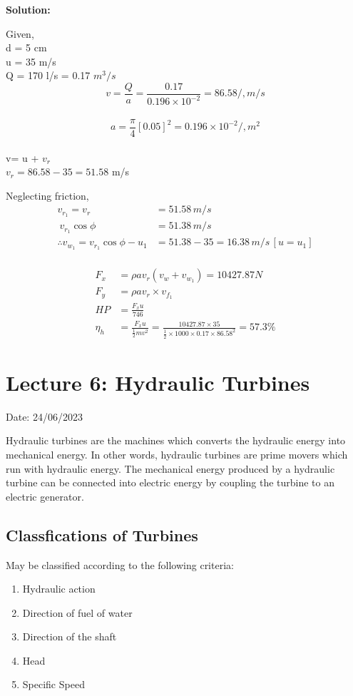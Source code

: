 \documentclass{article}
\begin{document}
\textbf{Solution:} 
\begin{multicols}{2}
  Given,\\
  d = 5 cm \\
  u = 35 m/s \\
  Q = 170 l/s = 0.17 $m^3/s$ \\
  $$v = \frac{Q}{a} = \frac{0.17}{0.196\times 10^{-2}} = 86.58 /, m/s$$ \\
  $$a = \frac{\pi}{4} \left[0.05\right]^2 = 0.196 \times 10^{-2} /, m^2$$ \\
  v= u + $v_r$ \\
  $v_r = 86.58 - 35 = 51.58$ m/s \\ 
\end{multicols}

Neglecting friction,\\
\begin{align*}
  v_{r_1} = v_r &= 51.58 \, m/s \\\
  v_{r_1} \cos \phi &= 51.38 \, m/s \\
  \therefore v_{w_1} = v_{r_1} \cos \phi - u_1 &= 51.38 -35 = 16.38 \, m/s \, [u = u_1] \\ 
\end{align*}

\begin{align*}
  F_x &=\rho a v_r \left(v_w + v_{w_1}\right) = 10427.87 N \\
  F_y &=\rho a v_r \times v_{f_1} \\
  HP &= \frac{F_x u}{746} \\
  \eta_h &= \frac{F_x u}{\frac{1}{2} m v^2} =  \frac{10427.87 \times 35}{\frac{1}{2} \times 1000 \times 0.17 \times 86.58^2} = 57.3\% 
\end{align*}
\hrulefill


\section{Lecture 6: Hydraulic Turbines}
\hfill Date: 24/06/2023

Hydraulic turbines are the machines which converts the hydraulic energy into mechanical energy. In other words, hydraulic turbines are prime movers which run with hydraulic energy. The mechanical energy produced by a hydraulic turbine can be connected into electric energy by coupling the turbine to an electric generator. 

\subsection*{Classfications of Turbines}
May be classified according to the following criteria:
\begin{enumerate}
  \item Hydraulic action 
  \item Direction of fuel of water 
  \item Direction of the shaft
  \item Head 
  \item Specific Speed 
\end{enumerate}
\end{document}

